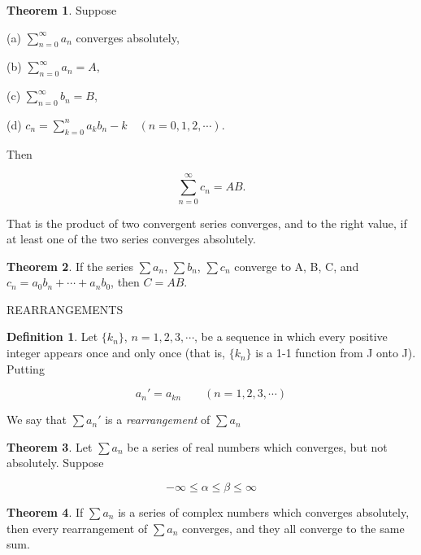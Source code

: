 \documentclass{article}
\theoremstyle{definition}
\newtheorem{defi}{Definition}
\newtheorem{theo}{Theorem}
\theoremstyle{remark}
\begin{document}
\begin{theo}
	Suppose
	
	(a) $\sum^\infty_{n=0} a_n$ converges absolutely,
	
	(b) $\sum^\infty_{n=0} a_n=A$,
	
	(c) $\sum^\infty_{n=0} b_n=B$,
	
	(d) $c_n=\sum^n_{k=0} a_kb_n-k\quad (n=0,1,2,\cdots)$.

Then 

\[
\sum^\infty_{n=0}c_n=AB.
\]


\end{theo}

That is the product of two convergent series converges, and to the right value, if at least one of the two series converges absolutely.
\begin{theo}
	If the series $\sum a_n$, $\sum b_n$, $\sum c_n$ converge to A, B, C, and $c_n=a_0b_n+\cdots+a_n b_0$, then $C=AB$.
\end{theo}

\newpage

REARRANGEMENTS

\begin{defi}

Let $\{k_n\}$, $n=1,2,3,\cdots$, be a sequence in which every positive integer appears once and only once (that is, $\{k_n\}$ is a 1-1 function from J onto J). Putting

\[
a_n'=a_{kn}\qquad (n=1,2,3,\cdots)
\]

We say that $\sum a_n'$ is a \textit{rearrangement} of $\sum a_n$
\end{defi}

\begin{theo}
	Let $\sum a_n$ be a series of real numbers which converges, but not absolutely. Suppose
	
	\[
	-\infty\le \alpha\le \beta\le \infty
	\]
	
\end{theo}

\begin{theo}
	If $\sum a_n$ is a series of complex numbers which converges absolutely, then every rearrangement of $\sum a_n$ converges, and they all converge to the same sum.             
\end{theo}
\end{document}
